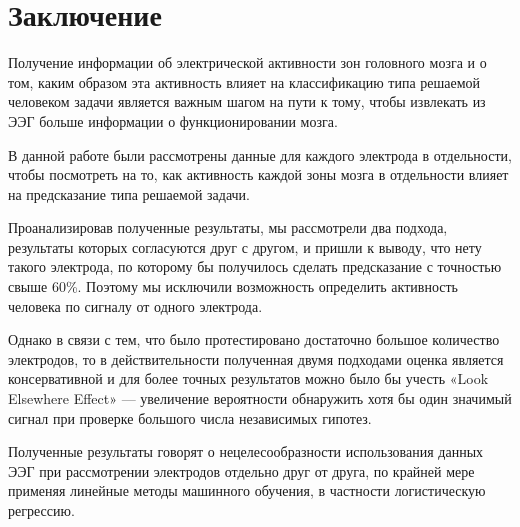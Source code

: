 \newpage

\section{Заключение}

Получение информации об электрической активности зон головного мозга и о том,
каким образом эта активность влияет на классификацию типа решаемой человеком задачи
является важным шагом на пути к тому, чтобы извлекать из ЭЭГ больше информации о
функционировании мозга.

В данной работе были рассмотрены данные для каждого электрода в отдельности, чтобы посмотреть
на то, как активность каждой зоны мозга в отдельности влияет на предсказание типа решаемой
задачи. 

Проанализировав полученные результаты, мы рассмотрели два подхода, результаты которых
согласуются друг с другом, и пришли к выводу, что нету такого электрода, по которому бы
получилось сделать предсказание с точностью свыше 60\%. Поэтому мы исключили возможность
определить активность человека по сигналу от одного электрода.

Однако в связи с тем, что было протестировано достаточно большое количество электродов, то в
действительности полученная двумя подходами оценка является консервативной и для более точных
результатов можно было бы учесть «Look Elsewhere Effect» --- увеличение вероятности обнаружить хотя
бы один значимый сигнал при проверке большого числа независимых гипотез.


Полученные результаты говорят о нецелесообразности использования данных ЭЭГ при рассмотрении
электродов отдельно друг от друга, по крайней мере применяя линейные методы машинного
обучения, в частности логистическую регрессию.

